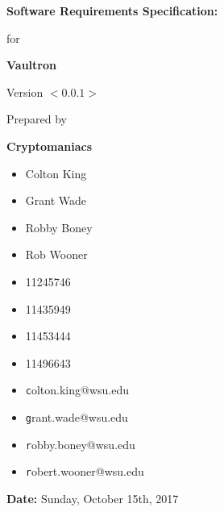 \documentclass[12pt]{report}
\begin{document}

{\Huge \textbf{Software Requirements Specification:}}
\vspace{5mm}
\begin{flushright}

    {\huge for}
    \vspace{20mm}

    \textbf{\Huge Vaultron}
    \vspace{20mm}

    {\huge Version $<0.0.1>$}
    \vspace{20mm}

    {\huge Prepared by}
    \vspace{20mm}

    \textbf{\huge Cryptomaniacs}
    \vspace{20mm}
\end{flushright}

\begin{multicols}{3}
    \begin{itemize}
        \item[] {\Large Colton King}
        \item[] {\Large Grant Wade}
        \item[] {\Large Robby Boney}
        \item[] {\Large Rob Wooner}
    \end{itemize}

    \begin{itemize}
        \item[] {\Large 11245746}
        \item[] {\Large 11435949}
        \item[] {\Large 11453444}
        \item[] {\Large 11496643}
    \end{itemize}

    \begin{itemize}
        \item[] {\Large\texttt colton.king@wsu.edu}
        \item[] {\Large\texttt grant.wade@wsu.edu}
        \item[] {\Large\texttt robby.boney@wsu.edu}
        \item[] {\Large\texttt robert.wooner@wsu.edu}
    \end{itemize}
\end{multicols}

\vfill

\begin{flushright}
    \vspace{20mm}
    {\Large \textbf{Date:} Sunday, October 15th, 2017}
\end{flushright}
\end{document}
